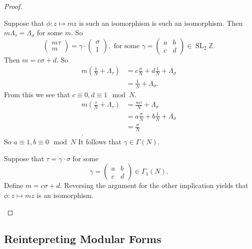 \documentclass[a4paper]{article}
\theoremstyle{theoremdd}
\theoremstyle{definitiondd}
\theoremstyle{remarkdd}
\newcommand{\Z}{\mathbb{Z}}
\newcommand{\ltr}{\par \noindent \framebox[1\width]{ $\implies$ } \hspace{.2cm}}
\newcommand{\rtl}{\par \noindent \framebox[1\width]{ $\impliedby$ } \hspace{.2cm} }
\DeclareMathOperator{\SL}{SL}
\begin{document}
\begin{proof}
\begin{enumerate}
	\ltr Suppose that $\phi: z\mapsto  m z$ is such an isomorphism is such an isomorphism.
	Then $m \Lambda_\tau = \Lambda_\sigma$ for some $m$. So \[
	\begin{pmatrix} m \tau \\ m \end{pmatrix} = 
	\gamma \cdot  \begin{pmatrix} \sigma \\ 1 \end{pmatrix} , 
	\text{ for some } \gamma = \begin{pmatrix} a & b \\ c & d \end{pmatrix} \in \SL_2 \Z
	.\] 
	Then $m = c \sigma + d$. So 
	 \begin{align*}
		 m \left( \frac{1}{N} + \Lambda_\tau \right)  &= c \frac{\sigma}{N} + d \frac{1}{N} + \Lambda_\sigma \\
		 &=  \frac{1}{N} + \Lambda_\sigma
	.\end{align*}
	From this we see that $c \equiv 0, d \equiv 1 \mod N$. 
	\begin{align*}
		m(\frac{\tau}{N} + \Lambda_\tau) &= \frac{m\tau}{N} + \Lambda_\sigma \\
		&= a \frac{\sigma}{N} + b \frac{1}{N} + \Lambda_\sigma \\
		&= \frac{\sigma}{N} \\
	.\end{align*}
	So $a \equiv 1, b \equiv 0 \mod N$
	It follows that $\gamma  \in \Gamma(N)$. 

	\rtl Suppose that $\tau = \gamma \cdot \sigma$ for some \[
		\gamma = \begin{pmatrix} a & b \\ c & d  \end{pmatrix} \in \Gamma_1(N)
	.\] 	
	Define $m = c \sigma + d$. Reversing the argument for the other implication yields that $\phi:z \mapsto m z$ is an isomorphism.
	\end{enumerate}
\end{proof}

\subsection{Reintepreting Modular Forms} \label{sec:reintepreting_modular_forms}
\end{document}
